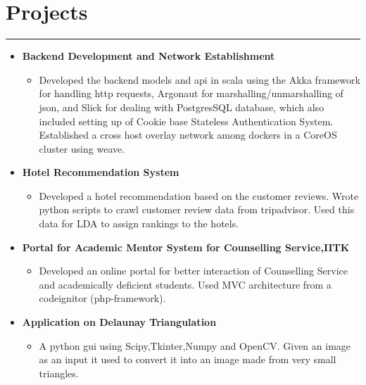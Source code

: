 \documentclass[a4paper]{article}
\begin{document}
\section*{Projects}
\hrule
\vspace{3mm}
  \begin{itemize}
  \item
   \textbf{Backend Development and Network Establishment}
  \begin{itemize}
          \textit{under Prof. Manindra Agarwal}
	   \item Developed the backend models and api in scala using the Akka framework
             for handling http requests, Argonaut for marshalling/unmarshalling of json,
             and Slick for dealing with PostgresSQL database, which also included
             setting up of Cookie base Stateless Authentication System.\\
             Established a cross host overlay network among dockers in a CoreOS 
              cluster using weave.
    \end{itemize}
   \item 
    \textbf{Hotel Recommendation System}
	   \begin{itemize}
	    \item Developed a hotel recommendation based on the customer reviews.
              Wrote python scripts to crawl customer review data from tripadvisor.
              Used this data for LDA to assign rankings to the hotels.
	   \end{itemize}
    \item
    \textbf{Portal for Academic Mentor System for Counselling Service,IITK}
	   \begin{itemize}
	    \item Developed an online portal for better interaction of Counselling 
            Service and academically deficient students. Used MVC architecture 
            from a codeignitor (php-framework).
	   \end{itemize}
    \item
      \textbf{Application on Delaunay  Triangulation}
	\begin{itemize}
	 \item A python gui using Scipy,Tkinter,Numpy and OpenCV. 
	      Given an image as an input it used to convert it into an image made from very small triangles.
	\end{itemize}
  \end{itemize}

  
\end{document}
